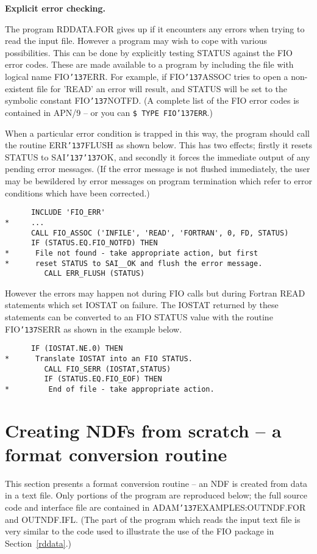 \documentclass[twoside,11pt]{article}
\renewcommand{\_}{{\tt\char'137}}
\newcommand{\xlabel}[1]{}
\begin{document}
{\bigskip\large\bf Explicit error checking.}

The program RDDATA.FOR gives up if it encounters any errors when trying to
read the input file.
However a program may wish to cope with various possibilities.
This can be done by explicitly testing STATUS against the FIO error codes.
These are made available to a program by including the file with 
logical name FIO\_ERR.
For example, if FIO\_ASSOC tries to open a non-existent file for 'READ'
an error will result, and STATUS will be set to the symbolic constant 
FIO\_NOTFD.
(A complete list of the FIO error codes is contained in APN/9
-- or you can {\tt \$ TYPE FIO\_ERR}.)

When a particular error condition is trapped in this way, the program 
should call the routine ERR\_FLUSH as shown below. This has two effects; 
firstly it resets STATUS
to SAI\_\_OK, and secondly it forces the immediate output of any pending 
error messages. (If the error message is not flushed immediately, the user 
may be bewildered by error messages on program termination which refer to
error conditions which have been corrected.)
\begin{verbatim}
      INCLUDE 'FIO_ERR'
*     ...
      CALL FIO_ASSOC ('INFILE', 'READ', 'FORTRAN', 0, FD, STATUS)
      IF (STATUS.EQ.FIO_NOTFD) THEN
*      File not found - take appropriate action, but first
*      reset STATUS to SAI__OK and flush the error message.
         CALL ERR_FLUSH (STATUS)
\end{verbatim}
However the errors may happen not during FIO calls 
but during Fortran READ statements which set 
IOSTAT on failure.
The IOSTAT returned by these statements can be converted to an FIO STATUS 
value with the routine FIO\_SERR as shown in the example below.
\begin{verbatim}
      IF (IOSTAT.NE.0) THEN
*      Translate IOSTAT into an FIO STATUS.
         CALL FIO_SERR (IOSTAT,STATUS)
         IF (STATUS.EQ.FIO_EOF) THEN
*         End of file - take appropriate action.
\end{verbatim}

\newpage
\section{Creating NDFs from scratch -- a format conversion routine\label{outndf}\xlabel{creating_ndfs_from_scratch}}

This section presents a format conversion routine --
an NDF is created from data in a text file.
Only portions of the program are reproduced below; 
the full source code and interface file are contained in 
ADAM\_EXAMPLES:OUTNDF.FOR and OUTNDF.IFL.
(The part of the program which reads the input text file is very similar
to the code used to illustrate the use of the FIO package 
in Section~\ref{rddata}.)
\end{document}
